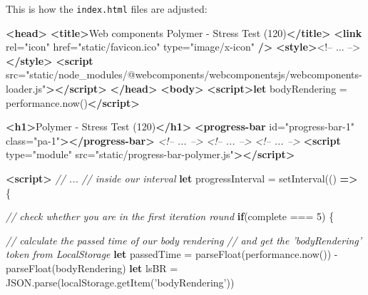 \documentclass[11pt]{article}
\newenvironment{Shaded}{}{}
\newcommand{\KeywordTok}[1]{\textcolor[rgb]{0.00,0.44,0.13}{\textbf{{#1}}}}
\newcommand{\DecValTok}[1]{\textcolor[rgb]{0.25,0.63,0.44}{{#1}}}
\newcommand{\StringTok}[1]{\textcolor[rgb]{0.25,0.44,0.63}{{#1}}}
\newcommand{\CommentTok}[1]{\textcolor[rgb]{0.38,0.63,0.69}{\textit{{#1}}}}
\newcommand{\OtherTok}[1]{\textcolor[rgb]{0.00,0.44,0.13}{{#1}}}
\newcommand{\FunctionTok}[1]{\textcolor[rgb]{0.02,0.16,0.49}{{#1}}}
\newcommand{\NormalTok}[1]{{#1}}
\newcommand{\VariableTok}[1]{\textcolor[rgb]{0.10,0.09,0.49}{{#1}}}
\newcommand{\ControlFlowTok}[1]{\textcolor[rgb]{0.00,0.44,0.13}{\textbf{{#1}}}}
\newcommand{\OperatorTok}[1]{\textcolor[rgb]{0.40,0.40,0.40}{{#1}}}
\newcommand{\AttributeTok}[1]{\textcolor[rgb]{0.49,0.56,0.16}{{#1}}}
\begin{document}
This is how the \texttt{index.html} files are adjusted:

    \begin{Shaded}
\begin{Highlighting}[]

\KeywordTok{<head>}
  \KeywordTok{<title>}\NormalTok{Web components Polymer - Stress Test (120)}\KeywordTok{</title>}
  \KeywordTok{<link}\OtherTok{ rel=}\StringTok{"icon"}\OtherTok{ href=}\StringTok{"static/favicon.ico"}\OtherTok{ type=}\StringTok{"image/x-icon"} \KeywordTok{/>}
  \KeywordTok{<style>}\NormalTok{<!-- }\FunctionTok{...}\NormalTok{ --}\OperatorTok{>}\KeywordTok{</style>}
  \KeywordTok{<script}\OtherTok{ src=}\StringTok{"static/node_modules/@webcomponents/webcomponentsjs/webcomponents-loader.js"}\KeywordTok{></script>}
\KeywordTok{</head>}
\KeywordTok{<body>}
    \KeywordTok{<script>let}\NormalTok{ bodyRendering }\OperatorTok{=} \VariableTok{performance}\NormalTok{.}\AttributeTok{now}\NormalTok{()}\KeywordTok{</script>}

    \KeywordTok{<h1>}\NormalTok{Polymer - Stress Test (120)}\KeywordTok{</h1>}
    \KeywordTok{<progress-bar}\OtherTok{ id=}\StringTok{"progress-bar-1"}\OtherTok{ class=}\StringTok{"pa-1"}\KeywordTok{></progress-bar>}
    \CommentTok{<!-- ... -->}
    \CommentTok{<!-- ... -->}
    \CommentTok{<!-- ... -->}
    \KeywordTok{<script}\OtherTok{ type=}\StringTok{"module"}\OtherTok{ src=}\StringTok{"static/progress-bar-polymer.js"}\KeywordTok{></script>}

    \KeywordTok{<script>}
    \CommentTok{// ...}
    \CommentTok{// inside our interval}
        \KeywordTok{let}\NormalTok{ progressInterval }\OperatorTok{=} \AttributeTok{setInterval}\NormalTok{(() }\KeywordTok{=>} \OperatorTok{\{}
        
        \CommentTok{// check whether you are in the first iteration round}
            \ControlFlowTok{if}\NormalTok{(complete }\OperatorTok{===} \DecValTok{5}\NormalTok{) }\OperatorTok{\{}
        
                \CommentTok{// calculate the passed time of our body rendering }
                \CommentTok{// and get the 'bodyRendering' token from LocalStorage}
                \KeywordTok{let}\NormalTok{ passedTime }\OperatorTok{=} \AttributeTok{parseFloat}\NormalTok{(}\VariableTok{performance}\NormalTok{.}\AttributeTok{now}\NormalTok{()) }\OperatorTok{-} \AttributeTok{parseFloat}\NormalTok{(bodyRendering)}
                \KeywordTok{let}\NormalTok{ lsBR }\OperatorTok{=} \VariableTok{JSON}\NormalTok{.}\AttributeTok{parse}\NormalTok{(}\VariableTok{localStorage}\NormalTok{.}\AttributeTok{getItem}\NormalTok{(}\StringTok{'bodyRendering'}\NormalTok{))}
        

\end{Highlighting}
\end{Shaded}
\end{document}
